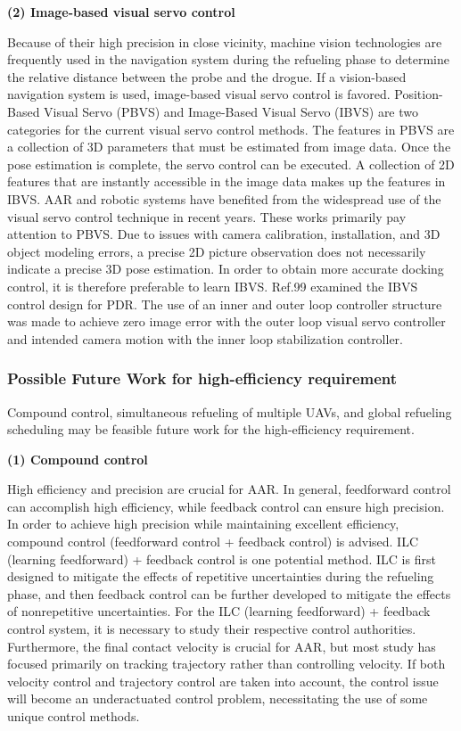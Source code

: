 \textbf{(2) Image-based visual servo control }

Because of their high precision in close vicinity, machine vision
technologies are frequently used in the navigation system during the
refueling phase to determine the relative distance between the probe
and the drogue. If a vision-based navigation system is used, image-based
visual servo control is favored. Position-Based Visual Servo (PBVS)
and Image-Based Visual Servo (IBVS) are two categories for the current
visual servo control methods. The features in PBVS are a collection
of 3D parameters that must be estimated from image data. Once the
pose estimation is complete, the servo control can be executed. A
collection of 2D features that are instantly accessible in the image
data makes up the features in IBVS. AAR and robotic systems have benefited
from the widespread use of the visual servo control technique in recent
years. These works primarily pay attention to PBVS. Due to issues
with camera calibration, installation, and 3D object modeling errors,
a precise 2D picture observation does not necessarily indicate a precise
3D pose estimation. In order to obtain more accurate docking control,
it is therefore preferable to learn IBVS. Ref.99 examined the IBVS
control design for PDR. The use of an inner and outer loop controller
structure was made to achieve zero image error with the outer loop
visual servo controller and intended camera motion with the inner
loop stabilization controller. 

\subsubsection{Possible Future Work for high-efficiency requirement }

Compound control, simultaneous refueling of multiple UAVs, and global
refueling scheduling may be feasible future work for the high-efficiency
requirement. 

\textbf{(1) Compound control} 

High efficiency and precision are crucial for AAR. In general, feedforward
control can accomplish high efficiency, while feedback control can
ensure high precision. In order to achieve high precision while maintaining
excellent efficiency, compound control (feedforward control + feedback
control) is advised. \textquotedbl ILC (learning feedforward) + feedback
control\textquotedbl{} is one potential method. ILC is first designed
to mitigate the effects of repetitive uncertainties during the refueling
phase, and then feedback control can be further developed to mitigate
the effects of nonrepetitive uncertainties. For the \textquotedbl ILC
(learning feedforward) + feedback control\textquotedbl{} system, it
is necessary to study their respective control authorities. Furthermore,
the final contact velocity is crucial for AAR, but most study has
focused primarily on tracking trajectory rather than controlling velocity.
If both velocity control and trajectory control are taken into account,
the control issue will become an underactuated control problem, necessitating
the use of some unique control methods.


